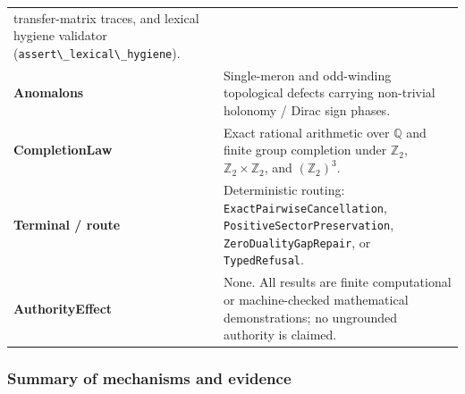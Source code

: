 \documentclass[
  11pt,
]{article}
\newcommand{\passthrough}[1]{#1}
\begin{document}
\begin{longtable}[]{@{}
  >{\raggedright\arraybackslash}p{}
  >{\raggedright\arraybackslash}p{}@{}}
transfer-matrix traces, and lexical hygiene validator
(\passthrough{\lstinline!assert\_lexical\_hygiene!}). \\
\textbf{Anomalons} & Single-meron and odd-winding topological defects
carrying non-trivial holonomy / Dirac sign phases. \\
\textbf{CompletionLaw} & Exact rational arithmetic over \(\mathbb{Q}\)
and finite group completion under \(\mathbb{Z}_2\),
\(\mathbb{Z}_2 \times \mathbb{Z}_2\), and \((\mathbb{Z}_2)^3\). \\
\textbf{Terminal / route} & Deterministic routing:
\passthrough{\lstinline!ExactPairwiseCancellation!},
\passthrough{\lstinline!PositiveSectorPreservation!},
\passthrough{\lstinline!ZeroDualityGapRepair!}, or
\passthrough{\lstinline!TypedRefusal!}. \\
\textbf{AuthorityEffect} & None. All results are finite computational or
machine-checked mathematical demonstrations; no ungrounded authority is
claimed. \\
\end{longtable}

\subsubsection{Summary of mechanisms and
evidence}\label{summary-of-mechanisms-and-evidence}
\end{document}
